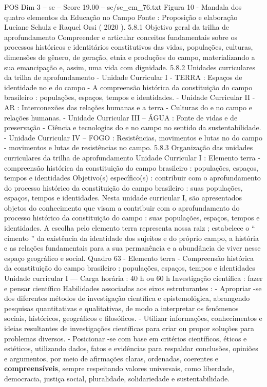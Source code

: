 \begin{textsample}{POS Dim 3 – sc – Score 19.00 – sc/sc\_em\_76.txt}
Figura 10 - Mandala dos quatro elementos da Educação no Campo Fonte : Proposição e elaboração Luciane Schulz e Raquel Orsi ( 2020 ). 5.8.1 Objetivo geral da trilha de aprofundamento Compreender e articular conceitos fundamentais sobre os processos históricos e identitários constitutivos das vidas, populações, culturas, dimensões de gênero, de geração, etnia e produções do campo, materializando a sua emancipação e, assim, uma vida com dignidade. 5.8.2 Unidades curriculares da trilha de aprofundamento - Unidade Curricular I - TERRA : Espaços de identidade no e do campo - A compreensão histórica da constituição do campo brasileiro : populações, espaços, tempos e identidades. - Unidade Curricular II - AR : Interconexões das relações humanas e a terra - Culturas do e no campo e relações humanas. - Unidade Curricular III – ÁGUA : Fonte de vidas e de preservação - Ciência e tecnologias do e no campo no sentido da sustentabilidade. - Unidade Curricular IV – FOGO : Resistências, movimentos e lutas no do campo - movimentos e lutas de resistências no campo. 5.8.3 Organização das unidades curriculares da trilha de aprofundamento Unidade Curricular I : Elemento terra - compreensão histórica da constituição do campo brasileiro : populações, espaços, tempos e identidades Objetivo(s) específico(s) : contribuir com o aprofundamento do processo histórico da constituição do campo brasileiro : suas populações, espaços, tempos e identidades.
Nesta unidade curricular I, são apresentados objetos do conhecimento que visam a contribuir com o aprofundamento do processo histórico da constituição do campo : suas populações, espaços, tempos e identidades.
A escolha pelo elemento terra representa nossa raiz ; estabelece o “ cimento ” da existência da identidade dos sujeitos e do próprio campo, a história e as relações fundamentais para a sua permanência e a abundância de viver nesse espaço geográfico e social.
Quadro 63 - Elemento terra - Compreensão histórica da constituição do campo brasileiro : populações, espaços, tempos e identidades Unidade curricular I — Carga horária : 40 h ou 60 h Investigação científica : fazer e pensar científico Habilidades associadas aos eixos estruturantes : - Apropriar -se dos diferentes métodos de investigação científica e epistemológica, abrangendo pesquisas quantitativas e qualitativas, de modo a interpretar os fenômenos sociais, históricos, geográficos e filosóficos. - Utilizar informações, conhecimentos e ideias resultantes de investigações científicas para criar ou propor soluções para problemas diversos. - Posicionar -se com base em critérios científicos, éticos e estéticos, utilizando dados, fatos e evidências para respaldar conclusões, opiniões e argumentos, por meio de afirmações claras, ordenadas, coerentes e \textbf{compreensíveis}, sempre respeitando valores universais, como liberdade, democracia, justiça social, pluralidade, solidariedade e sustentabilidade.

\end{textsample}
